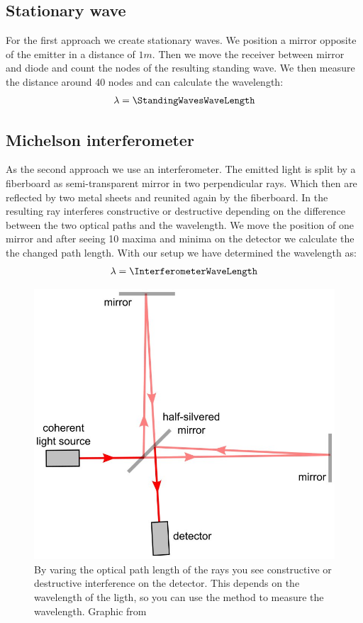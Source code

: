 \documentclass[a4paper,10pt,twocolumn]{article}
\begin{document}
    \subsection{Stationary wave}
    For the first approach we create stationary waves.
    We position a mirror opposite of the emitter in a distance of $1m$.
    Then we move the receiver between mirror and diode and count the nodes of the resulting standing wave.
    We then measure the distance around 40 nodes and can calculate the wavelength:
    \begin{align*}
        \lambda = \StandingWavesWaveLength
    \end{align*}
    \subsection{Michelson interferometer}
    As the second approach we use an interferometer.
    The emitted light is split by a fiberboard as semi-transparent mirror in two perpendicular rays.
    Which then are reflected by two metal sheets and reunited again by the fiberboard. 
    In the resulting ray interferes constructive or destructive depending on the difference between the two optical paths
    and the wavelength.
    We move the position of one mirror and after seeing 10 maxima and minima on the detector we calculate the the changed
    path length.
    With our setup we have determined the wavelength as:
    \begin{align*}
        \lambda = \InterferometerWaveLength
    \end{align*}
    \begin{figure}[htbp]
        \includegraphics[width=0.9\linewidth]{Interferometer}
        \center
        \caption{By varing the optical path length of the rays you see constructive or destructive interference on the
        detector. This depends on the wavelength of the ligth, so you can use the method to measure the wavelength.
        Graphic from~\cite{imageMichelsonInterferometerWiki}}
        \label{fig:Interferometer}
    \end{figure}
\end{document}
